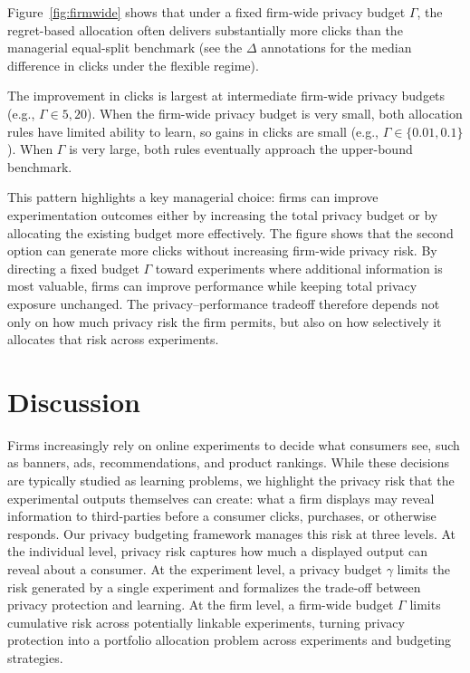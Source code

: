 \documentclass[mksc,nonblindrev]{informs3}
\begin{document}
Figure~\ref{fig:firmwide} shows that under a fixed firm-wide privacy budget $\Gamma$, the regret-based allocation often delivers substantially more clicks than the managerial equal-split benchmark (see the $\Delta$ annotations for the median difference in clicks under the flexible regime).

The improvement in clicks is largest at intermediate firm-wide privacy budgets (e.g., $\Gamma \in {5,20}$). When the firm-wide privacy budget is very small, both allocation rules have limited ability to learn, so gains in clicks are small (e.g., $\Gamma \in \{0.01, 0.1\}$). When $\Gamma$ is very large, both rules eventually approach the upper-bound benchmark.

This pattern highlights a key managerial choice: firms can improve experimentation outcomes either by increasing the total privacy budget or by allocating the existing budget more effectively. The figure shows that the second option can generate more clicks without increasing firm-wide privacy risk. By directing a fixed budget $\Gamma$ toward experiments where additional information is most valuable, firms can improve performance while keeping total privacy exposure unchanged. The privacy--performance tradeoff therefore depends not only on how much privacy risk the firm permits, but also on how selectively it allocates that risk across experiments.

\section{Discussion}\label{sec:conclusion}
Firms increasingly rely on online experiments to decide what consumers see, such as banners, ads, recommendations, and product rankings. While these decisions are typically studied as learning problems, we highlight the privacy risk that the experimental outputs themselves can create: what a firm displays may reveal information to third-parties before a consumer clicks, purchases, or otherwise responds. Our privacy budgeting framework manages this risk at three levels. At the individual level, privacy risk captures how much a displayed output can reveal about a consumer. At the experiment level, a privacy budget $\gamma$ limits the risk generated by a single experiment and formalizes the trade-off between privacy protection and learning. At the firm level, a firm-wide budget $\Gamma$ limits cumulative risk across potentially linkable experiments, turning privacy protection into a portfolio allocation problem across experiments and budgeting strategies.
\end{document}
